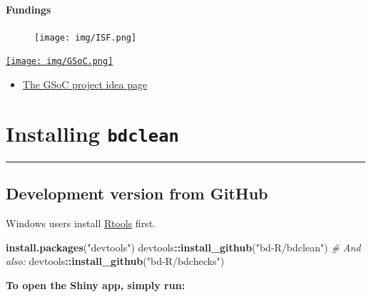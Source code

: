 \documentclass[]{book}
\newenvironment{Shaded}{\begin{snugshade}}{\end{snugshade}}
\newcommand{\KeywordTok}[1]{\textcolor[rgb]{0.13,0.29,0.53}{\textbf{#1}}}
\newcommand{\StringTok}[1]{\textcolor[rgb]{0.31,0.60,0.02}{#1}}
\newcommand{\CommentTok}[1]{\textcolor[rgb]{0.56,0.35,0.01}{\textit{#1}}}
\newcommand{\OperatorTok}[1]{\textcolor[rgb]{0.81,0.36,0.00}{\textbf{#1}}}
\newcommand{\NormalTok}[1]{#1}
\providecommand{\tightlist}{%
  \setlength{\itemsep}{0pt}\setlength{\parskip}{0pt}}
\begin{document}
\subsubsection*{Fundings}\label{fundings}

\begin{figure}
\centering
\texttt{[image: img/ISF.png]}
\caption{}
\end{figure}

\href{https://summerofcode.withgoogle.com/\%20target=\%22_blank\%22}{\texttt{[image: img/GSoC.png]}}

\begin{itemize}
\tightlist
\item
  \href{https://github.com/rstats-gsoc/gsoc2018/wiki/bdclean\%3A-User-friendly-biodiversity-data-cleaning-pipeline\%20target=\%22_blank\%22}{The
  GSoC project idea page}
\end{itemize}

\chapter{\texorpdfstring{Installing
\texttt{bdclean}}{Installing bdclean}}\label{installing-bdclean}

\begin{center}\rule{0.5\linewidth}{\linethickness}\end{center}

\section{Development version from
GitHub}\label{development-version-from-github}

Windows users install
\href{https://cran.r-project.org/bin/windows/Rtools/}{Rtools} first.

\begin{Shaded}
\begin{Highlighting}[]
\KeywordTok{install.packages}\NormalTok{(}\StringTok{"devtools"}\NormalTok{)}
\NormalTok{devtools}\OperatorTok{::}\KeywordTok{install_github}\NormalTok{(}\StringTok{"bd-R/bdclean"}\NormalTok{)}
\CommentTok{# And also:}
\NormalTok{devtools}\OperatorTok{::}\KeywordTok{install_github}\NormalTok{(}\StringTok{"bd-R/bdchecks"}\NormalTok{)}
\end{Highlighting}
\end{Shaded}

\textbf{To open the Shiny app, simply run:}
\end{document}
